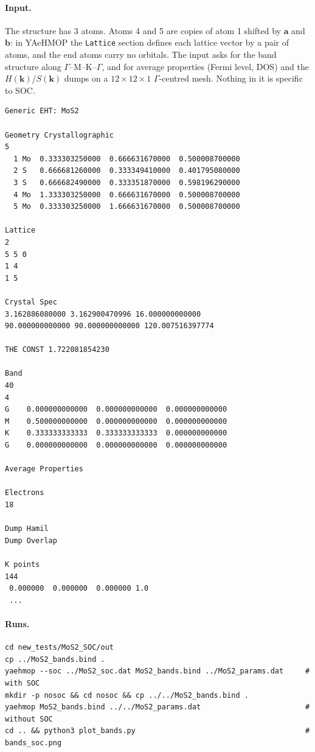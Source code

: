 \documentclass[11pt,a4paper]{article}
\newcommand{\file}[1]{\texttt{#1}}
\begin{document}
\paragraph{Input.} The structure has 3 atoms. Atoms 4 and 5 are copies of atom 1 shifted by
$\mathbf{a}$ and $\mathbf{b}$: in YAeHMOP the \texttt{Lattice} section defines each lattice
vector by a pair of atoms, and the end atoms carry no orbitals. The input asks for the
band structure along $\Gamma$--M--K--$\Gamma$, and for average properties (Fermi level, DOS)
and the $H(\mathbf{k})$/$S(\mathbf{k})$ dumps on a $12\times12\times1$ $\Gamma$-centred
mesh. Nothing in it is specific to SOC.
\begin{lstlisting}[style=sh,caption={\file{new\_tests/MoS2\_SOC/MoS2\_bands.bind} (the 144 mesh points are cut)}]
Generic EHT: MoS2

Geometry Crystallographic
5
  1 Mo  0.333303250000  0.666631670000  0.500008700000
  2 S   0.666681260000  0.333349410000  0.401795080000
  3 S   0.666682490000  0.333351870000  0.598196290000
  4 Mo  1.333303250000  0.666631670000  0.500008700000
  5 Mo  0.333303250000  1.666631670000  0.500008700000

Lattice
2
5 5 0
1 4
1 5

Crystal Spec
3.162886080000 3.162900470996 16.000000000000
90.000000000000 90.000000000000 120.007516397774

THE CONST 1.722081854230

Band
40
4
G    0.000000000000  0.000000000000  0.000000000000
M    0.500000000000  0.000000000000  0.000000000000
K    0.333333333333  0.333333333333  0.000000000000
G    0.000000000000  0.000000000000  0.000000000000

Average Properties

Electrons
18

Dump Hamil
Dump Overlap

K points
144
 0.000000  0.000000  0.000000 1.0
 ...
\end{lstlisting}

\paragraph{Runs.}
\begin{lstlisting}[style=sh]
cd new_tests/MoS2_SOC/out
cp ../MoS2_bands.bind .
yaehmop --soc ../MoS2_soc.dat MoS2_bands.bind ../MoS2_params.dat     # with SOC
mkdir -p nosoc && cd nosoc && cp ../../MoS2_bands.bind .
yaehmop MoS2_bands.bind ../../MoS2_params.dat                        # without SOC
cd .. && python3 plot_bands.py                                       # bands_soc.png
\end{lstlisting}
\end{document}
